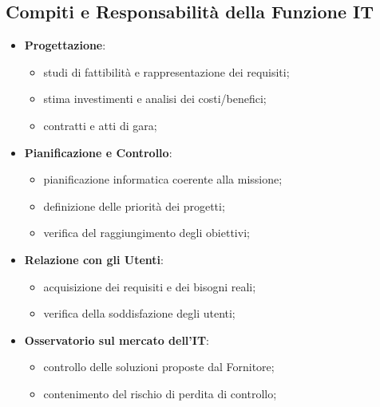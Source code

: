 \subsection{Compiti e Responsabilità della Funzione IT}\label{sub:cv_compiti_e_responsabilit_della_funzione_it} %
\begin{note}[Compiti]
    \begin{itemize}
        \item \textbf{Progettazione}:
            \begin{itemize}
                \item studi di fattibilità e rappresentazione dei requisiti;
                \item stima investimenti e analisi dei costi/benefici;
                \item contratti e atti di gara;
            \end{itemize}
        \item \textbf{Pianificazione e Controllo}:
            \begin{itemize}
                \item pianificazione informatica coerente alla missione;
                \item definizione delle priorità dei progetti;
                \item verifica del raggiungimento degli obiettivi;
            \end{itemize}
        \item \textbf{Relazione con gli Utenti}:
            \begin{itemize}
                \item acquisizione dei requisiti e dei bisogni reali;
                \item verifica della soddisfazione degli utenti;
            \end{itemize}
        \item \textbf{Osservatorio sul mercato dell'IT}:
            \begin{itemize}
                \item controllo delle soluzioni proposte dal Fornitore;
                \item contenimento del rischio di perdita di controllo;
            \end{itemize}
    \end{itemize}
\end{note}
